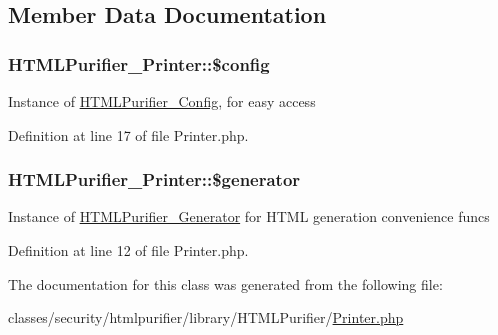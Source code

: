 \subsection{Member Data Documentation}
\hypertarget{classHTMLPurifier__Printer_a36736bff5c38e17fd9f9f4cd051cfdb8}{
\subsubsection[{\$config}]{\setlength{\rightskip}{0pt plus 5cm}H\+T\+M\+L\+Purifier\+\_\+\+Printer\+::\$config\hspace{0.3cm}{\ttfamily [protected]}}}\label{classHTMLPurifier__Printer_a36736bff5c38e17fd9f9f4cd051cfdb8}
Instance of \hyperlink{classHTMLPurifier__Config}{H\+T\+M\+L\+Purifier\+\_\+\+Config}, for easy access 

Definition at line 17 of file Printer.\+php.

\hypertarget{classHTMLPurifier__Printer_a512dc8c69720eb69180b01000987380b}{
\subsubsection[{\$generator}]{\setlength{\rightskip}{0pt plus 5cm}H\+T\+M\+L\+Purifier\+\_\+\+Printer\+::\$generator\hspace{0.3cm}{\ttfamily [protected]}}}\label{classHTMLPurifier__Printer_a512dc8c69720eb69180b01000987380b}
Instance of \hyperlink{classHTMLPurifier__Generator}{H\+T\+M\+L\+Purifier\+\_\+\+Generator} for H\+T\+M\+L generation convenience funcs 

Definition at line 12 of file Printer.\+php.



The documentation for this class was generated from the following file\+:\begin{DoxyCompactItemize}
\item 
classes/security/htmlpurifier/library/\+H\+T\+M\+L\+Purifier/\hyperlink{Printer_8php}{Printer.\+php}\end{DoxyCompactItemize}
